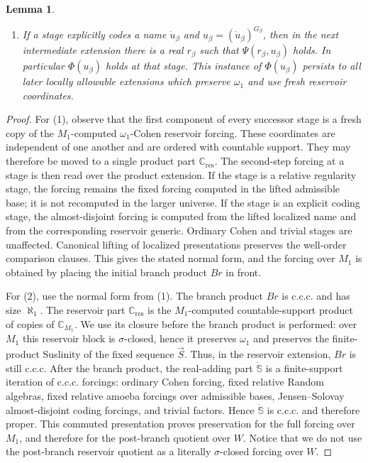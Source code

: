 \documentclass[a4paper,11pt]{article}
\newtheorem{lemma}[theorem]{Lemma}
\begin{document}
\begin{lemma}
\begin{enumerate}
   \item If a stage explicitly codes a name \(\dot u_\beta\) and
   \(u_\beta=(\dot u_\beta)^{G_\beta}\), then in the next intermediate
   extension there is a real \(r_\beta\) such that \(\Psi(r_\beta,u_\beta)\)
   holds.  In particular \(\Phi(u_\beta)\) holds at that stage.  This instance
   of \(\Phi(u_\beta)\) persists to all later locally allowable extensions
   which preserve \(\omega_1\) and use fresh reservoir coordinates.
\end{enumerate}
\end{lemma}

\begin{proof}
For (1), observe that the first component of every successor stage is a fresh
copy of the \(M_1\)-computed \(\omega_1\)-Cohen reservoir forcing.  These
coordinates are independent of one another and are ordered with countable
support.  They may therefore be moved to a single product part
\(\mathbb C_{\mathrm{res}}\).  The second-step forcing at a stage is then read
over the product extension.  If the stage is a relative regularity stage, the
forcing remains the fixed forcing computed in the lifted admissible base; it is
not recomputed in the larger universe.  If the stage is an explicit coding
stage, the almost-disjoint forcing is computed from the lifted localized name
and from the corresponding reservoir generic.  Ordinary Cohen and trivial
stages are unaffected.  Canonical lifting of localized presentations preserves
the well-order comparison clauses.  This gives the stated normal form, and the
forcing over \(M_1\) is obtained by placing the initial branch product
\(Br\) in front.

For (2), use the normal form from (1).  The branch product \(Br\) is c.c.c. and
has size \(\aleph_1\).  The reservoir part \(\mathbb C_{\mathrm{res}}\) is the
\(M_1\)-computed countable-support product of copies of \(\mathbb C_{M_1}\).  We
use its closure before the branch product is performed: over \(M_1\) this
reservoir block is \(\sigma\)-closed, hence it preserves \(\omega_1\) and
preserves the finite-product Suslinity of the fixed sequence \(\vec S\).  Thus,
in the reservoir extension, \(Br\) is still c.c.c.  After the branch product, the
real-adding part \(\dot{\mathbb S}\) is a finite-support iteration of c.c.c.
forcings: ordinary Cohen forcing, fixed relative Random algebras, fixed relative
amoeba forcings over admissible bases, Jensen--Solovay almost-disjoint coding
forcings, and trivial factors.  Hence \(\dot{\mathbb S}\) is c.c.c. and therefore
proper.  This commuted presentation proves preservation for the full forcing
over \(M_1\), and therefore for the post-branch quotient over \(W\).  Notice that
we do not use the post-branch reservoir quotient as a literally \(\sigma\)-closed
forcing over \(W\).


\end{proof}
\end{document}
